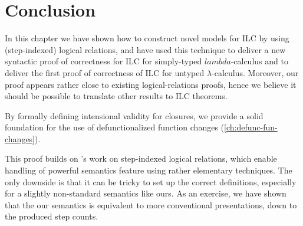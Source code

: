 \section{Conclusion}
In this chapter we have shown how to construct novel models for
ILC by using (step-indexed) logical relations, and have used this
technique to deliver a new syntactic proof of correctness for ILC
for simply-typed $lambda$-calculus and to deliver the first proof
of correctness of ILC for untyped $\lambda$-calculus. Moreover,
our proof appears rather close to existing
logical-relations proofs, hence we believe it should be possible
to translate other results to ILC theorems.

By formally defining intensional validity for closures, we
provide a solid foundation for the use of defunctionalized
function changes (\cref{ch:defunc-fun-changes}).

This proof builds on \citet{Ahmed2006stepindexed}'s
work on step-indexed logical relations, which enable handling of
powerful semantics feature using rather elementary techniques.
The only downside is that it can be tricky to set up the correct
definitions, especially for a slightly non-standard semantics
like ours.
As an exercise, we have shown that the our semantics is
equivalent to more conventional presentations, down to the
produced step counts.
